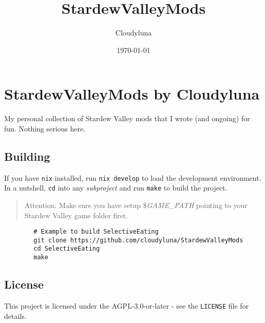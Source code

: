 \documentclass[a4paper,12pt]{article}
\title{StardewValleyMods}
\author{Cloudyluna}
\date{\today}
\begin{document}
	
	\section{StardewValleyMods by Cloudyluna}
	
	My personal collection of Stardew Valley mods that I wrote (and ongoing) for fun. Nothing serious here.
	
	
	\subsection{Building}
	
	If you have \texttt{nix} installed, run \texttt{nix develop} to load the development environment.
	In a nutshell, \texttt{cd} into any \textit{subproject} and run \texttt{make} to build the project.
	
	\begin{quote}
		Attention: Make sure you have setup \$\textit{GAME\_PATH} pointing to your Stardew Valley game folder first.
	\end{quote}
	
	\begin{verbatim}
		# Example to build SelectiveEating
		git clone https://github.com/cloudyluna/StardewValleyMods
		cd SelectiveEating
		make
	\end{verbatim}
	
	\subsection{License}
	
	This project is licensed under the AGPL-3.0-or-later - see the \texttt{LICENSE} file for details.
	
	
\end{document}
